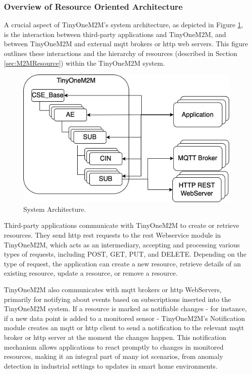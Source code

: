 \documentclass[a4paper,fleqn]{cas-dc}
\begin{document}
\subsubsection{Overview of Resource Oriented Architecture}

A crucial aspect of TinyOneM2M's system architecture, as depicted in Figure \ref{fig:systemarchitecture}, is the interaction between third-party applications and TinyOneM2M, and between TinyOneM2M and external \gls{mqtt} brokers or \gls{http} web servers. This figure outlines these interactions and the hierarchy of resources (described in Section \ref{sec:M2MResource}) within the TinyOneM2M system.

\begin{figure}[h]
	\centering
	\includegraphics[width=\linewidth]{SystemArchitectuRE.jpg}
	\caption{System Architecture.}
	\label{fig:systemarchitecture}
\end{figure}

Third-party applications communicate with TinyOneM2M to create or retrieve resources. They send \gls{http} \gls{rest} requests to the \gls{rest} Webservice module in TinyOneM2M, which acts as an intermediary, accepting and processing various types of requests, including POST, GET, PUT, and DELETE. Depending on the type of request, the application can create a new resource, retrieve details of an existing resource, update a resource, or remove a resource.

TinyOneM2M also communicates with \gls{mqtt} brokers or \gls{http} WebServers, primarily for notifying about events based on subscriptions inserted into the TinyOneM2M system. If a resource is marked as notifiable changes - for instance, if a new data point is added to a monitored sensor - TinyOneM2M's Notification module creates an \gls{mqtt} or \gls{http} client to send a notification to the relevant \gls{mqtt} broker or \gls{http} server at the moment the changes happen. This notification mechanism allows applications to react promptly to changes in monitored resources, making it an integral part of many \gls{iot} scenarios, from anomaly detection in industrial settings to updates in smart home environments.
\end{document}
